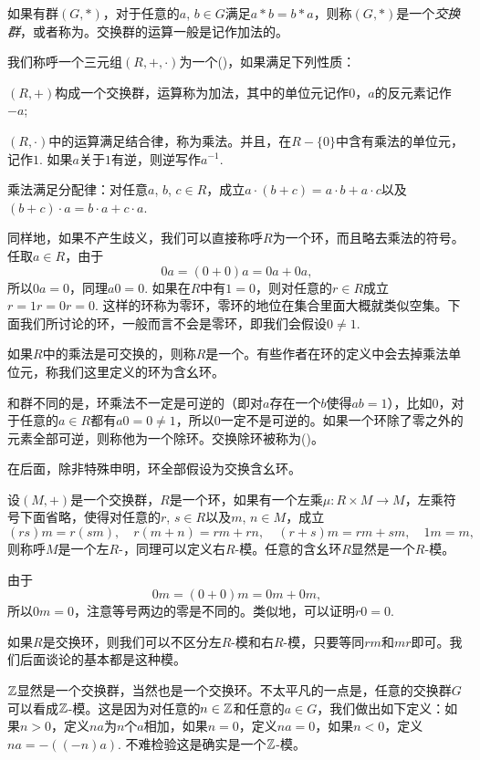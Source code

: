 如果有群$(G,*)$，对于任意的$a$, $b\in G$满足$a*b=b*a$，则称$(G,*)$是一个\textit{交换群}，或者称为。交换群的运算一般是记作加法的。

\para 我们称呼一个三元组$(R,+,\cdot)$为一个()，如果满足下列性质：

 $(R,+)$构成一个交换群，运算称为加法，其中的单位元记作$0$，$a$的反元素记作$-a$;

 $(R,\cdot)$中的运算满足结合律，称为乘法。并且，在$R-\{0\}$中含有乘法的单位元，记作$1$. 如果$a$关于$1$有逆，则逆写作$a^{-1}$.

 乘法满足分配律：对任意$a$, $b$, $c \in R$，成立$a\cdot(b+c)=a\cdot b+a\cdot c$以及$(b+c)\cdot a=b\cdot a+c\cdot a$.

同样地，如果不产生歧义，我们可以直接称呼$R$为一个环，而且略去乘法的符号。任取$a\in R$，由于
\[
	0a=(0+0)a=0a+0a,
\]
所以$0a=0$，同理$a0=0$. 如果在$R$中有$1=0$，则对任意的$r\in R$成立$r=1r=0r=0$. 这样的环称为零环，零环的地位在集合里面大概就类似空集。下面我们所讨论的环，一般而言不会是零环，即我们会假设$0\neq 1$.

如果$R$中的乘法是可交换的，则称$R$是一个。有些作者在环的定义中会去掉乘法单位元，称我们这里定义的环为含幺环。

和群不同的是，环乘法不一定是可逆的（即对$a$存在一个$b$使得$ab=1$），比如$0$，对于任意的$a\in R$都有$a0=0\neq 1$，所以$0$一定不是可逆的。如果一个环除了零之外的元素全部可逆，则称他为一个除环。交换除环被称为()。

在后面，除非特殊申明，环全部假设为交换含幺环。

\para 设$(M,+)$是一个交换群，$R$是一个环，如果有一个左乘$\mu:R\times M\to M$，左乘符号下面省略，使得对任意的$r$, $s\in R$以及$m$, $n\in M$，成立
\[
	(rs)m=r(sm),\quad r(m+n)=rm+rn,\quad (r+s)m=rm+sm,\quad 1m=m,
\]
则称呼$M$是一个左$R$-，同理可以定义右$R$-模。任意的含幺环$R$显然是一个$R$-模。

由于
\[
	0m=(0+0)m=0m+0m,
\]
所以$0m=0$，注意等号两边的零是不同的。类似地，可以证明$r0=0$. 

如果$R$是交换环，则我们可以不区分左$R$-模和右$R$-模，只要等同$rm$和$mr$即可。我们后面谈论的基本都是这种模。

\para $\mathbb{Z}$显然是一个交换群，当然也是一个交换环。不太平凡的一点是，任意的交换群$G$可以看成$\mathbb{Z}$-模。这是因为对任意的$n\in \mathbb{Z}$和任意的$a\in G$，我们做出如下定义：如果$n>0$，定义$na$为$n$个$a$相加，如果$n=0$，定义$na=0$，如果$n<0$，定义$na=-((-n)a)$. 不难检验这是确实是一个$\mathbb{Z}$-模。

